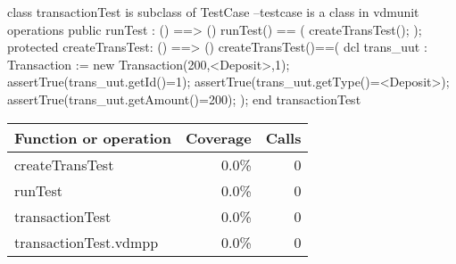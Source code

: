\documentclass[a4paper]{article}
\begin{document}
\title{}
\author{}
\begin{vdm_al}

class transactionTest is subclass of TestCase --testcase is a class in vdmunit
operations
    public runTest : () ==> ()
    runTest() == (
        createTransTest();
    );
    protected createTransTest: () ==> ()
    createTransTest()==(
        dcl trans_uut : Transaction := new Transaction(200,<Deposit>,1);
        assertTrue(trans_uut.getId()=1);
        assertTrue(trans_uut.getType()=<Deposit>);
        assertTrue(trans_uut.getAmount()=200);
    );
end transactionTest
\end{vdm_al}
\bigskip
\begin{longtable}{|l|r|r|}
\hline
Function or operation & Coverage & Calls \\
\hline
\hline
createTransTest & 0.0\% & 0 \\
\hline
runTest & 0.0\% & 0 \\
\hline
transactionTest & 0.0\% & 0 \\
\hline
\hline
transactionTest.vdmpp & 0.0\% & 0 \\
\hline
\end{longtable}
\end{document}
